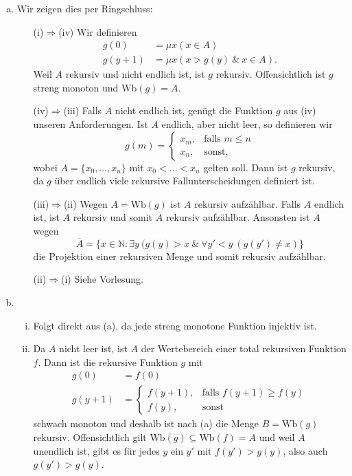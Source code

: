 \documentclass[german,headsepline]{scrartcl}
\begin{document}
	\begin{solution}
		\begin{enumerate}[(a)]
			\item Wir zeigen dies per Ringschluss:
				\begin{enumerate}[\hspace{45pt}]
					\item[(i)$\Rightarrow$(iv)] Wir definieren
						\begin{align*}
							g(0) &= \mu x(x\in A) \\
							g(y+1) &= \mu x(x>g(y)~\&~x\in A).
						\end{align*}
						Weil $A$ rekursiv und nicht endlich ist, ist $g$ rekursiv.
						Offensichtlich ist $g$ streng monoton und $\text{Wb}(g)=A$.
					\item[(iv)$\Rightarrow$(iii)] Falls $A$ nicht endlich ist, genügt die Funktion $g$ aus (iv) unseren Anforderungen.
						Ist $A$ endlich, aber nicht leer, so definieren wir
						\[g(m)=\begin{cases}
							x_m, &\text{falls }m\leq n \\
							x_n, &\text{sonst,}
						\end{cases}\]
						wobei $A=\{x_0,\dots,x_n\}$ mit $x_0<\ldots<x_n$ gelten soll.
						Dann ist $g$ rekursiv, da $g$ über endlich viele rekursive Fallunterscheidungen definiert ist.
					\item[(iii)$\Rightarrow$(ii)] Wegen $A=\text{Wb}(g)$ ist $A$ rekursiv aufzählbar.
						Falls $A$ endlich ist, ist $A$ rekursiv und somit $\overline{A}$ rekursiv aufzählbar. Ansonsten ist $\overline{A}$ wegen
						\[\overline{A}=\{x\in\mathbb{N}\colon\exists y~(g(y)>x~\&~\forall y'<y~(g(y')\neq x)\}\]
						die Projektion einer rekursiven Menge und somit rekursiv aufzählbar.
					\item[(ii)$\Rightarrow$(i)] Siehe Vorlesung.
				\end{enumerate}
			\item \begin{enumerate}[(i)]
					\item Folgt direkt aus (a), da jede streng monotone Funktion injektiv ist.
					\item Da $A$ nicht leer ist, ist $A$ der Wertebereich einer total rekursiven Funktion $f$.
						Dann ist die rekursive Funktion $g$ mit
						\begin{align*}
							g(0) &= f(0) \\
							g(y+1) &= \begin{cases}
								f(y+1), &\text{falls }f(y+1)\geq f(y) \\
								f(y), &\text{sonst}
							\end{cases}
						\end{align*}
						schwach monoton und deshalb ist nach (a) die Menge $B=\text{Wb}(g)$ rekursiv.
						Offensichtlich gilt $\text{Wb}(g)\subseteq \text{Wb}(f)=A$ und weil $A$ unendlich ist,
						gibt es für jedes $y$ ein $y'$ mit $f(y')>g(y)$, also auch $g(y')>g(y)$.
				\end{enumerate}
		\end{enumerate}
	\end{solution}
	
\end{document}
